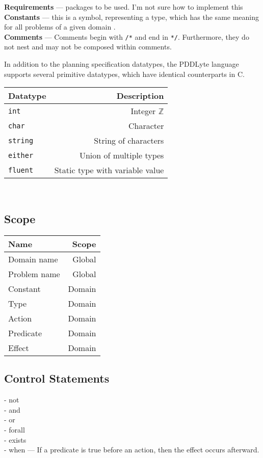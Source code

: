 \documentclass[
a4paper, %
11pt, %
onecolumn, %
openany, %
]{memoir}
\begin{document}
{\textbf{Requirements} --- packages to be used. I'm not sure how to implement this\\

\textbf{Constants} --- this is a symbol, representing a type, which has the same meaning for all problems of a given domain \cite{pddl98}.\\

\textbf{Comments} --- Comments begin with \texttt{/*} and end in \texttt{*/}. Furthermore, they do not nest and may not be composed within comments.

%
}

In addition to the planning specification datatypes, the PDDLyte language supports several primitive datatypes, which have identical counterparts in C. \\

\begin{tabular}{| l | r |}
\hline
Datatype    & Description \\
\hline
\texttt{int} & Integer $\mathbb{Z}$ \\
\hline
\texttt{char} & Character\\
\hline
\texttt{string} & String of characters\\
\hline
\texttt{either} & Union of multiple types\\
\hline
\texttt{fluent} & Static type with variable value \\
\hline
\end{tabular}\\


\subsection{Scope}
\begin{tabular}{| l | r |}
\hline
Name    & Scope\\
\hline
Domain name & Global \\
Problem name & Global \\
Constant & Domain\\
Type  & Domain \\
Action  & Domain \\
Predicate & Domain \\
Effect & Domain \\
\hline
\end{tabular}

\subsection{Control Statements}
- not\\
- and\\
- or\\
- forall\\
- exists\\
- when --- If a predicate is true before an action, then the effect occurs afterward.\\
\end{document}
